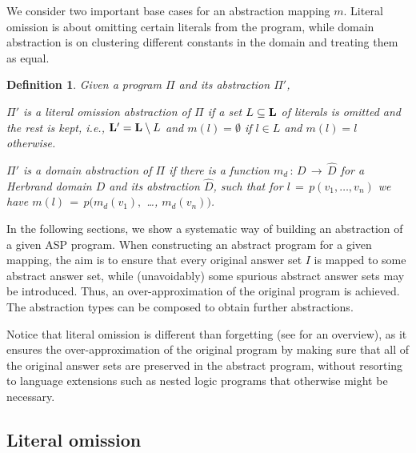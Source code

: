 \documentclass{new_tlp}
\newcounter{myenumctr}
\newenvironment{myenumerate}{\begin{list}{(\arabic{myenumctr})}{\usecounter{myenumctr}
\topsep=2pt
\setlength{\leftmargin}{7pt}
\setlength{\itemindent}{\labelwidth}
\setlength{\itemsep}{0cm}}}
{\end{list}}
\newcommand{\nhbls}{\vspace*{-0.5\baselineskip}}
\newtheorem{defn}{Definition}
\begin{document}
We consider two important base cases for an abstraction mapping $m$. Literal
omission is about omitting certain literals from the program, while
domain abstraction is on clustering different constants in the domain
and treating them as equal. 


\begin{defn}
Given a program $\Pi$ and its abstraction $\Pi'$,
\begin{myenumerate}
\item $\Pi'$ is a \emph{literal omission abstraction of $\Pi$} if a
  set $L \subseteq {\bf L}$ of literals is omitted and the rest is
  kept, i.e., %
  ${\bf L}' = {\bf L}
  \setminus L$ and $m(l)=\emptyset$ if $l\in L$ and $m(l)=l$ otherwise.
\item $\Pi'$ is a \emph{domain abstraction of $\Pi$} if there is a function $m_{d}\,{:}\,D
\,{\rightarrow}\, \widehat{D}$ for a Herbrand domain $D$ and its abstraction $\widehat{D}$, such that for $l\,{=}\,p(v_1,\dots,v_n)$ we have $m(l)\,{=}\,p(m_{d}(v_1),$ \ldots, $m_{d}(v_n))$.
\end{myenumerate}
\end{defn}

In the following sections, we show a systematic way of building an abstraction of a given ASP program.
When constructing an abstract program for a given mapping, the aim is
to ensure that every original answer set $I$ is mapped to some
abstract answer set, while (unavoidably) some spurious abstract answer
sets may be introduced. Thus, an over-approximation of the original program is achieved.
The abstraction types can be composed to obtain further abstractions.

Notice that literal omission is different
than forgetting (see \cite{DBLP:conf/lpnmr/Leite17} for an overview),
as it ensures the over-approximation of the original program by making
sure that all of the original answer sets are preserved in the
abstract program, without resorting to language extensions such as
nested logic programs that otherwise might be necessary. 

\nhbls

\subsection{Literal omission} 
\end{document}
